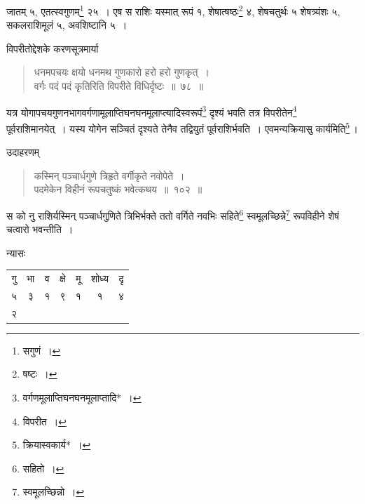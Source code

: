\documentclass[10pt, openany]{book}
\begin{document}
{{जातम् ५, एतत्स्वगुणम्\renewcommand{\thefootnote}{\s ८}\footnote{\s *सगुणं~।} २५~।}
{एष स राशिः यस्मात् रूपं १, शेषात्षष्ठः\renewcommand{\thefootnote}{\s ९}\footnote{\s *षष्टः~।} ४, शेषचतुर्थः ५
शेषत्र्यंशः ५, सकलराशिमूलं}
{५, अवशिष्टानि ५~।}


\newpage

{विपरीतोद्देशके करणसूत्रमार्या\textemdash}

\begin{quote}

{\bs धनमपचयः क्षयो धनमथ गुणकारो हरो हरो गुणकृत्~। \\
 वर्गः पदं पदं कृतिरिति विपरीते विधिर्दृष्टः~॥~७८~॥}\end{quote}

{यत्र योगापचयगुणनभागवर्गणामूलाप्तिघनघनमूलाप्त्यादिस्वरूपं\renewcommand{\thefootnote}{\s १}\footnote{\s *वर्गणमूलाप्तिघनघनमूलाप्तादि*~।}  दृश्यं
भवति तत्र}
{विपरीतेन\renewcommand{\thefootnote}{\s २}\footnote{\s विपरीत~।} पूर्वराशिमानयेत्~। यस्य योगेन सञ्चितं दृश्यते तेनैव
तद्वियुतं पूर्वराशिर्भवति~।}
{एवमन्यक्रियासु कार्यमिति\renewcommand{\thefootnote}{\s ३}\footnote{\s *क्रियास्वकार्य*~।}\,।}
\vspace{3mm}

{उदाहरणम्\textemdash}

\begin{quote}

{\eg कस्मिन् पञ्चार्धगुणे त्रिहृते वर्गीकृते नवोपेते~। \\
 पदमेकेन विहीनं रूपचतुष्कं भवेत्कथय~॥~१०२~॥}\end{quote}

{स को नु राशिर्यस्मिन् पञ्चार्धगुणिते त्रिभिर्भक्ते ततो वर्गिते नवभिः
सहिते\renewcommand{\thefootnote}{\s ४}\footnote{\s सहितो~।} स्वमूलच्छिन्ने\renewcommand{\thefootnote}{\s ५}\footnote{\s स्वमूलच्छिन्नो~।} रूपविहीने शेषं चत्वारो भवन्तीति~।}
\vspace{3mm}

{न्यासः\textendash \,\hspace{4mm}
\begin{tabular}{|c|c|c|c|c|c|c|}गु & भा & व & क्षे & मू & शोध्य &  दृ \\
५  & ३ &  १ &  ९ &  १ &  १ & ४  \\
२ & {} & {} & {} & {} & {} & {} \\
\hline \end{tabular}
}
\vspace{3mm}

}
\end{document}
